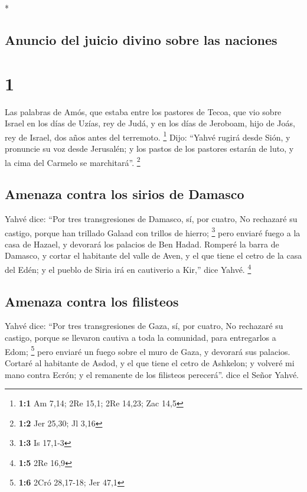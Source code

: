 \begin{paracol}{2} \switchcolumn[0]*

\hypertarget{anuncio-del-juicio-divino-sobre-las-naciones}{%
\subsection{Anuncio del juicio divino sobre las
naciones}\label{anuncio-del-juicio-divino-sobre-las-naciones}}

\hypertarget{section}{%
\section{1}\label{section}}

 Las palabras de Amós, que estaba entre los pastores de
Tecoa, que vio sobre Israel en los días de Uzías, rey de Judá, y en los
días de Jeroboam, hijo de Joás, rey de Israel, dos años antes del
terremoto. \footnote{\textbf{1:1} Am 7,14; 2Re 15,1; 2Re 14,23; Zac 14,5}
 Dijo: ``Yahvé rugirá desde Sión, y pronuncie su voz desde
Jerusalén; y los pastos de los pastores estarán de luto, y la cima del
Carmelo se marchitará''. \footnote{\textbf{1:2} Jer 25,30; Jl 3,16}

\hypertarget{amenaza-contra-los-sirios-de-damasco}{%
\subsection{Amenaza contra los sirios de
Damasco}\label{amenaza-contra-los-sirios-de-damasco}}

 Yahvé dice: ``Por tres transgresiones de Damasco, sí, por
cuatro, No rechazaré su castigo, porque han trillado Galaad con trillos
de hierro; \footnote{\textbf{1:3} Is 17,1-3}  pero enviaré
fuego a la casa de Hazael, y devorará los palacios de Ben Hadad.
 Romperé la barra de Damasco, y cortar el habitante del
valle de Aven, y el que tiene el cetro de la casa del Edén; y el pueblo
de Siria irá en cautiverio a Kir,'' dice Yahvé. \footnote{\textbf{1:5}
  2Re 16,9}

\hypertarget{amenaza-contra-los-filisteos}{%
\subsection{Amenaza contra los
filisteos}\label{amenaza-contra-los-filisteos}}

 Yahvé dice: ``Por tres transgresiones de Gaza, sí, por
cuatro, No rechazaré su castigo, porque se llevaron cautiva a toda la
comunidad, para entregarlos a Edom; \footnote{\textbf{1:6} 2Cró
  28,17-18; Jer 47,1}  pero enviaré un fuego sobre el muro
de Gaza, y devorará sus palacios.  Cortaré al habitante de
Asdod, y el que tiene el cetro de Ashkelon; y volveré mi mano contra
Ecrón; y el remanente de los filisteos perecerá''. dice el Señor Yahvé.


\end{paracol}
